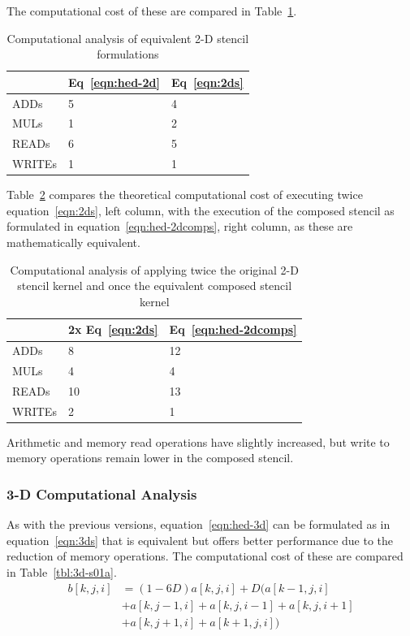 \documentclass{acm_proc_article-sp}
\begin{document}
The computational cost of these are compared in Table~\ref{tbl:2d-s01a}.
\begin{table}[ht]
\begin{center}
  \begin{tabular}{| l | l | l |}
    \hline
    & Eq~\eqref{eqn:hed-2d} & Eq~\ref{eqn:2ds} \\ \hline
    ADDs   & 5 & 4 \\ \hline
    MULs   & 1 & 2 \\ \hline
    READs  & 6 & 5 \\ \hline
    WRITEs & 1 & 1 \\ \hline
  \end{tabular}
  \caption{Computational analysis of equivalent 2-D stencil formulations}
  \label{tbl:2d-s01a}
\end{center}
\end{table}


Table~\ref{tbl:2d-s02a} compares the theoretical computational cost of executing twice equation~\eqref{eqn:2ds}, left column, with the execution of the composed stencil as formulated in equation~\eqref{eqn:hed-2dcomps}, right column, as these are mathematically equivalent.
\begin{table}[ht]
\begin{center}
  \begin{tabular}{| l | l | l |} \hline
     & 2x Eq~\eqref{eqn:2ds} & Eq~\eqref{eqn:hed-2dcomps} \\ \hline
    ADDs   & 8 & 12 \\ \hline
    MULs   & 4 & 4 \\ \hline
    READs  & 10 & 13 \\ \hline
    WRITEs & 2 & 1  \\ \hline
  \end{tabular}
    \caption{Computational analysis of applying twice the original 2-D stencil kernel and once the equivalent composed stencil kernel}
    \label{tbl:2d-s02a}
\end{center}
\end{table}
Arithmetic and memory read operations have slightly increased, but write to memory operations remain lower in the composed stencil.


\subsubsection{3-D Computational Analysis}
As with the previous versions, equation~\eqref{eqn:hed-3d} can be formulated as in equation~\eqref{eqn:3ds} that is equivalent but offers better performance due to the reduction of memory operations. The computational cost of these are compared in Table~\ref{tbl:3d-s01a}.
\begin{equation}
  \begin{split}
    b[k,j,i] &= (1-6D)a[k,j,i] + D(a[k-1,j,i]\\
    &+ a[k,j-1,i] + a[k,j,i-1] + a[k,j,i+1]\\
    &+ a[k,j+1,i] + a[k+1,j,i])
  \end{split}
  \label{eqn:3ds}
\end{equation}
\end{document}
